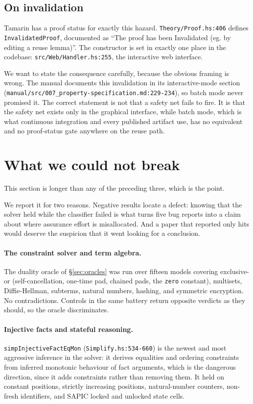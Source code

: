 \documentclass[version=preprint]{iacrcc}
\newcommand{\code}[1]{\texttt{\small #1}}
\theoremstyle{definition}
\theoremstyle{remark}
\begin{document}
\subsection{On invalidation}

Tamarin has a proof status for exactly this hazard.
\code{Theory/Proof.hs:406} defines \code{InvalidatedProof}, documented as ``The
proof has been Invalidated (eg. by editing a reuse lemma)''. The constructor is
set in exactly one place in the codebase: \code{src/Web/Handler.hs:255}, the
interactive web interface.

We want to state the consequence carefully, because the obvious framing is
wrong. The manual documents this invalidation in its interactive-mode section
(\code{manual/src/007\_property-specification.md:229-234}), so batch mode never
promised it. The correct statement is not that a safety net fails to fire. It
is that the safety net exists only in the graphical interface, while batch
mode, which is what continuous integration and every published artifact use,
has no equivalent and no proof-status gate anywhere on the reuse path.

\section{What we could not break}\label{sec:held}

This section is longer than any of the preceding three, which is the point.

We report it for two reasons. Negative results locate a defect: knowing that
the solver held while the classifier failed is what turns five bug reports into
a claim about where assurance effort is misallocated. And a paper that reported
only hits would deserve the suspicion that it went looking for a conclusion.

\paragraph{The constraint solver and term algebra.} The duality oracle of
\S\ref{sec:oracles} was run over fifteen models covering exclusive-or
(self-cancellation, one-time pad, chained pads, the \code{zero} constant),
multisets, Diffie-Hellman, subterms, natural numbers, hashing, and symmetric
encryption. No contradictions. Controls in the same battery return opposite
verdicts as they should, so the oracle discriminates.

\paragraph{Injective facts and stateful reasoning.} \code{simpInjectiveFactEqMon}
(\code{Simplify.hs:534-660}) is the newest and most aggressive inference in the
solver: it derives equalities and ordering constraints from inferred monotonic
behaviour of fact arguments, which is the dangerous direction, since it adds
constraints rather than removing them. It held on constant positions, strictly
increasing positions, natural-number counters, non-fresh identifiers, and
SAPIC locked and unlocked state cells.
\end{document}
